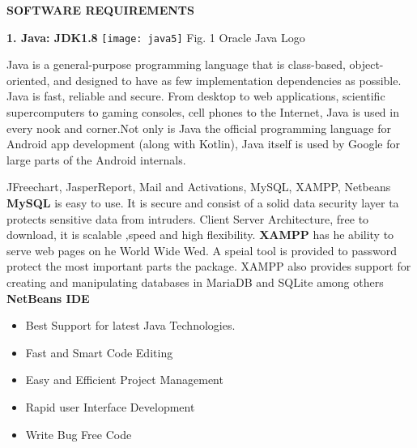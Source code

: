 \documentclass{article}
\begin{document}
\begin{center}
\textbf{SOFTWARE REQUIREMENTS}\newline
\end{center}
\textbf{1.	Java: JDK1.8}\newline
\texttt{[image: java5]}
\newline
Fig. 1 Oracle Java Logo\newline
\par Java is a general-purpose programming language that is class-based, object-oriented, and designed to have as few implementation dependencies as possible. Java is fast, reliable and secure. From desktop to web applications, scientific supercomputers to gaming consoles, cell phones to the Internet, Java is used in every nook and corner.Not only is Java the official programming language for Android app development (along with Kotlin), Java itself is used by Google for large parts of the Android internals.\newline
\par JFreechart, JasperReport, Mail and Activations, MySQL, XAMPP, Netbeans\newline\newline
\textbf{MySQL} is easy to use. It is secure and consist of a solid data security layer ta protects sensitive data from intruders. Client Server Architecture, free to download, it is scalable ,speed and high flexibility.\newline
\textbf{XAMPP} has he ability to serve web pages on he World Wide Wed. A speial tool is provided to password protect the most important parts the package. XAMPP also provides support for creating and manipulating databases in MariaDB and SQLite among others\newline
\textbf{NetBeans IDE}
\begin{itemize}  
\item Best Support for latest Java Technologies. 
\item Fast and Smart Code Editing
\item Easy and Efficient Project Management
\item Rapid user Interface Development
\item Write Bug Free Code
\end{itemize} 

\newpage
\end{document}
